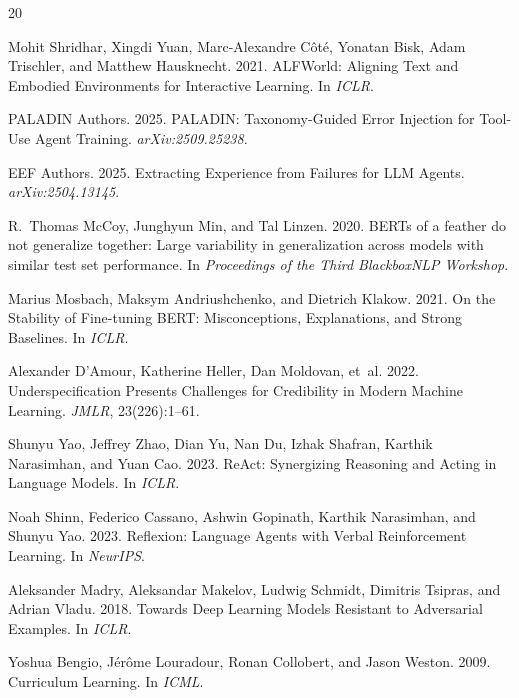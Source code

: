 \documentclass[11pt,a4paper]{article}
\begin{document}
\begin{thebibliography}{20}

Mohit Shridhar, Xingdi Yuan, Marc-Alexandre C{\^o}t{\'e}, Yonatan Bisk, Adam Trischler, and Matthew Hausknecht. 2021.
\newblock ALFWorld: Aligning Text and Embodied Environments for Interactive Learning.
\newblock In \emph{ICLR}.

{PALADIN Authors}. 2025.
\newblock PALADIN: Taxonomy-Guided Error Injection for Tool-Use Agent Training.
\newblock \emph{arXiv:2509.25238}.

{EEF Authors}. 2025.
\newblock Extracting Experience from Failures for LLM Agents.
\newblock \emph{arXiv:2504.13145}.

R.~Thomas McCoy, Junghyun Min, and Tal Linzen. 2020.
\newblock BERTs of a feather do not generalize together: Large variability in generalization across models with similar test set performance.
\newblock In \emph{Proceedings of the Third BlackboxNLP Workshop}.

Marius Mosbach, Maksym Andriushchenko, and Dietrich Klakow. 2021.
\newblock On the Stability of Fine-tuning BERT: Misconceptions, Explanations, and Strong Baselines.
\newblock In \emph{ICLR}.

Alexander D'Amour, Katherine Heller, Dan Moldovan, et~al. 2022.
\newblock Underspecification Presents Challenges for Credibility in Modern Machine Learning.
\newblock \emph{JMLR}, 23(226):1--61.

Shunyu Yao, Jeffrey Zhao, Dian Yu, Nan Du, Izhak Shafran, Karthik Narasimhan, and Yuan Cao. 2023.
\newblock ReAct: Synergizing Reasoning and Acting in Language Models.
\newblock In \emph{ICLR}.

Noah Shinn, Federico Cassano, Ashwin Gopinath, Karthik Narasimhan, and Shunyu Yao. 2023.
\newblock Reflexion: Language Agents with Verbal Reinforcement Learning.
\newblock In \emph{NeurIPS}.

Aleksander Madry, Aleksandar Makelov, Ludwig Schmidt, Dimitris Tsipras, and Adrian Vladu. 2018.
\newblock Towards Deep Learning Models Resistant to Adversarial Examples.
\newblock In \emph{ICLR}.

Yoshua Bengio, J{\'e}r{\^o}me Louradour, Ronan Collobert, and Jason Weston. 2009.
\newblock Curriculum Learning.
\newblock In \emph{ICML}.

\end{thebibliography}
\end{document}
